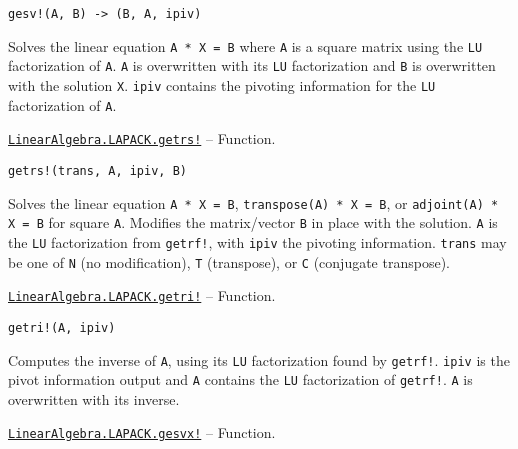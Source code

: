 \begin{adjustwidth}{2em}{0pt}


\begin{verbatim}
gesv!(A, B) -> (B, A, ipiv)
\end{verbatim}

Solves the linear equation \texttt{A * X = B} where \texttt{A} is a square matrix using the \texttt{LU} factorization of \texttt{A}. \texttt{A} is overwritten with its \texttt{LU} factorization and \texttt{B} is overwritten with the solution \texttt{X}. \texttt{ipiv} contains the pivoting information for the \texttt{LU} factorization of \texttt{A}.



\end{adjustwidth}
\hypertarget{16091201483800894861}{} 
\hyperlink{16091201483800894861}{\texttt{LinearAlgebra.LAPACK.getrs!}}  -- {Function.}

\begin{adjustwidth}{2em}{0pt}


\begin{verbatim}
getrs!(trans, A, ipiv, B)
\end{verbatim}

Solves the linear equation \texttt{A * X = B}, \texttt{transpose(A) * X = B}, or \texttt{adjoint(A) * X = B} for square \texttt{A}. Modifies the matrix/vector \texttt{B} in place with the solution. \texttt{A} is the \texttt{LU} factorization from \texttt{getrf!}, with \texttt{ipiv} the pivoting information. \texttt{trans} may be one of \texttt{N} (no modification), \texttt{T} (transpose), or \texttt{C} (conjugate transpose).



\end{adjustwidth}
\hypertarget{14980283213207275035}{} 
\hyperlink{14980283213207275035}{\texttt{LinearAlgebra.LAPACK.getri!}}  -- {Function.}

\begin{adjustwidth}{2em}{0pt}


\begin{verbatim}
getri!(A, ipiv)
\end{verbatim}

Computes the inverse of \texttt{A}, using its \texttt{LU} factorization found by \texttt{getrf!}. \texttt{ipiv} is the pivot information output and \texttt{A} contains the \texttt{LU} factorization of \texttt{getrf!}. \texttt{A} is overwritten with its inverse.



\end{adjustwidth}
\hypertarget{11990298428229663507}{} 
\hyperlink{11990298428229663507}{\texttt{LinearAlgebra.LAPACK.gesvx!}}  -- {Function.}


